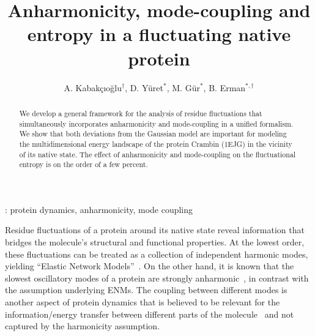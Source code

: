 \documentclass[12pt]{iopart}
\begin{document}
\title{Anharmonicity, mode-coupling and entropy in a fluctuating
  native protein}

\author{A. Kabak{\c c}{\i}o{\u g}lu$^\dagger$, D. Y{\" u}ret$^*$, M. G{\" u}r$^*$, B. Erman$^{*,\dagger}$}
\address{Colleges of Sciences$^\dagger$ and Engineering$^*$, Ko{\c c} University, Sar{\i}yer, 34450, {\. I}stanbul, Turkey}


\begin{abstract}
We develop a general framework for the analysis of residue
fluctuations that simultaneously incorporates anharmonicity and
mode-coupling in a unified formalism. We show that both deviations
from the Gaussian model are important for modeling the
multidimensional energy landscape of the protein Crambin (1EJG) in the
vicinity of its native state.  The effect of anharmonicity and
mode-coupling on the fluctuational entropy is on the order of a few
percent.

\end{abstract}


\vspace{2pc}
: protein dynamics, anharmonicity, mode coupling
\maketitle

Residue fluctuations of a protein around its native state reveal
information that bridges the molecule's structural and functional
properties.  At the lowest order, these fluctuations can be treated as
a collection of independent harmonic modes, yielding ``Elastic Network
Models''~\cite{bahar1997direct,atilgan2001anisotropy}. On the other
hand, it is known that the slowest oscillatory modes of a protein are
strongly
anharmonic~\cite{hayward1994harmonic,pontiggia2007anharmonicity,yogurtcu2009statistical},
in contrast with the assumption underlying ENMs. The coupling between
different modes is another aspect of protein dynamics that is believed
to be relevant for the information/energy transfer between different
parts of the molecule~\cite{moritsugu2000vibrational,leitner2008energy} and not
captured by the harmonicity assumption.
\end{document}
